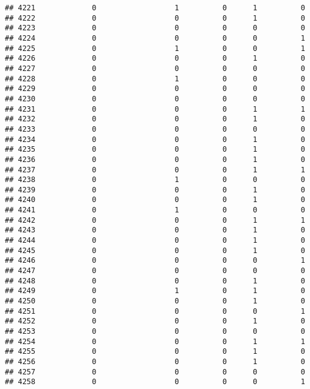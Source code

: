 \documentclass[
]{article}
\begin{document}
\begin{verbatim}
## 4221             0                  1          0      1          0
## 4222             0                  0          0      1          0
## 4223             0                  0          0      0          0
## 4224             0                  0          0      0          1
## 4225             0                  1          0      0          1
## 4226             0                  0          0      1          0
## 4227             0                  0          0      0          0
## 4228             0                  1          0      0          0
## 4229             0                  0          0      0          0
## 4230             0                  0          0      0          0
## 4231             0                  0          0      1          1
## 4232             0                  0          0      1          0
## 4233             0                  0          0      0          0
## 4234             0                  0          0      1          0
## 4235             0                  0          0      1          0
## 4236             0                  0          0      1          0
## 4237             0                  0          0      1          1
## 4238             0                  1          0      0          0
## 4239             0                  0          0      1          0
## 4240             0                  0          0      1          0
## 4241             0                  1          0      0          0
## 4242             0                  0          0      1          1
## 4243             0                  0          0      1          0
## 4244             0                  0          0      1          0
## 4245             0                  0          0      1          0
## 4246             0                  0          0      0          1
## 4247             0                  0          0      0          0
## 4248             0                  0          0      1          0
## 4249             0                  1          0      1          0
## 4250             0                  0          0      1          0
## 4251             0                  0          0      0          1
## 4252             0                  0          0      1          0
## 4253             0                  0          0      0          0
## 4254             0                  0          0      1          1
## 4255             0                  0          0      1          0
## 4256             0                  0          0      1          0
## 4257             0                  0          0      0          0
## 4258             0                  0          0      0          1

\end{verbatim}
\end{document}
